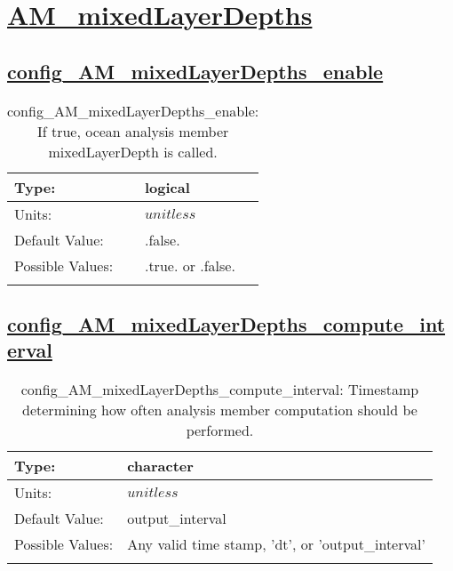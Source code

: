 \section[AM\_mixedLayerDepths]{\hyperref[sec:nm_tab_AM_mixedLayerDepths]{AM\_mixedLayerDepths}}
\label{sec:nm_sec_AM_mixedLayerDepths}
\subsection[config\_AM\_mixedLayerDepths\_enable]{\hyperref[sec:nm_tab_AM_mixedLayerDepths]{config\_AM\_mixedLayerDepths\_enable}}
\label{subsec:nm_sec_config_AM_mixedLayerDepths_enable}
\begin{center}
\begin{longtable}{| p{2.0in} || p{4.0in} |}
    \hline
    Type: & logical \\
    \hline
    Units: & $unitless$ \\
    \hline
    Default Value: & .false. \\
    \hline
    Possible Values: & .true. or .false. \\
    \hline
    \caption{config\_AM\_mixedLayerDepths\_enable: If true, ocean analysis member mixedLayerDepth is called.}
\end{longtable}
\end{center}
\subsection[config\_AM\_mixedLayerDepths\_compute\_interval]{\hyperref[sec:nm_tab_AM_mixedLayerDepths]{config\_AM\_mixedLayerDepths\_compute\_interval}}
\label{subsec:nm_sec_config_AM_mixedLayerDepths_compute_interval}
\begin{center}
\begin{longtable}{| p{2.0in} || p{4.0in} |}
    \hline
    Type: & character \\
    \hline
    Units: & $unitless$ \\
    \hline
    Default Value: & output\_interval \\
    \hline
    Possible Values: & Any valid time stamp, 'dt', or 'output\_interval' \\
    \hline
    \caption{config\_AM\_mixedLayerDepths\_compute\_interval: Timestamp determining how often analysis member computation should be performed.}
\end{longtable}
\end{center}
